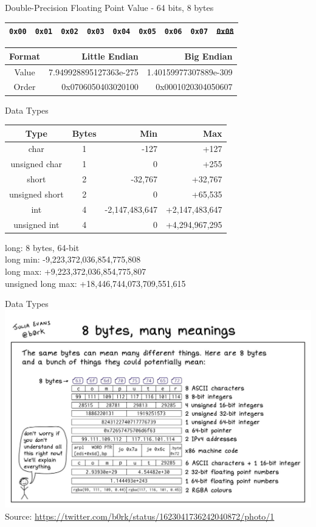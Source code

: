 \documentclass{beamer}
\begin{document}
\begin{frame}{Double-Precision Floating Point Value - 64 bits, 8 bytes}

\begin{table}[]
\begin{tabular}{|l|l|l|l|l|l|l|l|l|}
\hline
 \color{red}\texttt{0x00} & \color{red}\texttt{0x01} & \color{red}\texttt{0x02} & \color{red}\texttt{0x03} & \color{red}\texttt{0x04} & \color{red}\texttt{0x05} & \color{red}\texttt{0x06} & \color{red}\texttt{0x07} &
 \sout{\texttt{0x08}} \\
\hline 
\end{tabular}
\end{table}

\begin{table}[]
\begin{tabular}{c r r}
Format & Little Endian & Big Endian \\
\hline
Value &  7.949928895127363e-275   & 1.40159977307889e-309 \\
Order & 0x0706050403020100 & 0x0001020304050607
\end{tabular}
\end{table}

\end{frame}

\begin{frame}{Data Types}
\begin{table}[]
\begin{tabular}{c c r r}
Type & Bytes & Min & Max \\
\hline
char & 1 & -127 & +127 \\
unsigned char & 1 & 0 & +255 \\
short & 2 & -32,767 & +32,767   \\
unsigned short & 2 & 0 & +65,535 \\
int & 4 & -2,147,483,647 & +2,147,483,647 \\
unsigned int & 4 & 0 & +4,294,967,295
\end{tabular}
\end{table}
long: 8 bytes, 64-bit \\
long min: -9,223,372,036,854,775,808 \\
long max: +9,223,372,036,854,775,807 \\
unsigned long max: +18,446,744,073,709,551,615
\end{frame}

\begin{frame}{Data Types}
\includegraphics[scale=0.256]{DataTypesMeme.jpeg}
\footnotesize Source: \url{https://twitter.com/b0rk/status/1623041736242040872/photo/1}
\end{frame}
\end{document}
